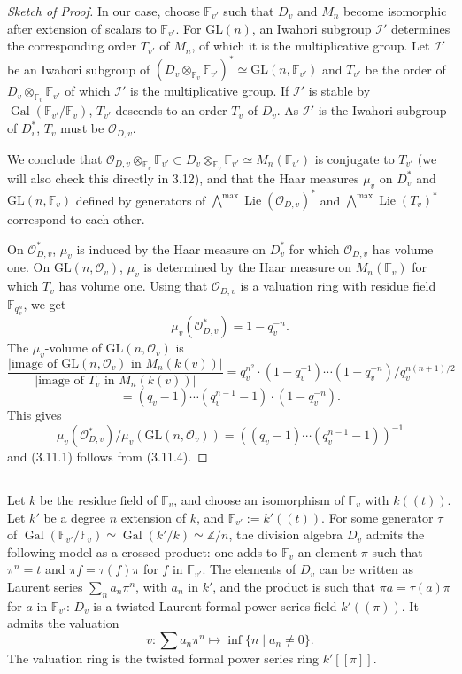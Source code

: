 \documentclass[11pt,a4paper]{article}
\theoremstyle{plain}
\theoremstyle{definition}
\DeclareMathOperator{\Gal}{Gal}
\DeclareMathOperator{\Lie}{Lie}
\newcommand{\F}{\mathbb{F}}
\newcommand{\Z}{\mathbb{Z}}
\newcommand{\GL}{\mathrm{GL}}
\begin{document}
\begin{proof}[Sketch of Proof]
In our case, choose $\mathbb{F}_{v'}$ such that $D_v$ and $M_n$ become isomorphic after extension of scalars to $\mathbb{F}_{v'}$. For $\GL(n)$, an Iwahori subgroup $\mathcal{I}'$ determines the corresponding order $T_{v'}$ of $M_n$, of which it is the multiplicative group. Let $\mathcal{I}'$ be an Iwahori subgroup of $(D_v \otimes_{\mathbb{F}_v} \mathbb{F}_{v'})^* \simeq \GL(n, \mathbb{F}_{v'})$ and $T_{v'}$ be the order of $D_v \otimes_{\mathbb{F}_v} \mathbb{F}_{v'}$ of which $\mathcal{I}'$ is the multiplicative group. If $\mathcal{I}'$ is stable by $\Gal(\mathbb{F}_{v'}/\mathbb{F}_v)$, $T_{v'}$ descends to an order $T_v$ of $D_v$. As $\mathcal{I}'$ is the Iwahori subgroup of $D_v^*$, $T_v$ must be $\mathcal{O}_{D,v}$.

We conclude that $\mathcal{O}_{D,v} \otimes_{\mathbb{F}_v} \mathbb{F}_{v'} \subset D_v \otimes_{\mathbb{F}_v} \mathbb{F}_{v'} \simeq M_n(\mathbb{F}_{v'})$ is conjugate to $T_{v'}$ (we will also check this directly in 3.12), and that the Haar measures $\mu_v$ on $D_v^*$ and $\GL(n, \mathbb{F}_v)$ defined by generators of $\bigwedge^{\max} \Lie(\mathcal{O}_{D,v})^*$ and $\bigwedge^{\max} \Lie(T_v)^*$ correspond to each other.

On $\mathcal{O}_{D,v}^*$, $\mu_v$ is induced by the Haar measure on $D_v^*$ for which $\mathcal{O}_{D,v}$ has volume one. On $\GL(n, \mathcal{O}_v)$, $\mu_v$ is determined by the Haar measure on $M_n(\mathbb{F}_v)$ for which $T_v$ has volume one. Using that $\mathcal{O}_{D,v}$ is a valuation ring with residue field $\F_{q_v^n}$, we get
\[
\mu_v(\mathcal{O}_{D,v}^*) = 1 - q_v^{-n}.
\]
The $\mu_v$-volume of $\GL(n, \mathcal{O}_v)$ is
\[
\frac{|\text{image of }\GL(n, \mathcal{O}_v)\text{ in }M_n(k(v))|}{|\text{image of }T_v\text{ in }M_n(k(v))|} = q_v^{n^2} \cdot (1-q_v^{-1}) \cdots (1-q_v^{-n}) / q_v^{n(n+1)/2}
\]
\[
= (q_v - 1) \cdots (q_v^{n-1} - 1) \cdot (1 - q_v^{-n}).
\]
This gives
\[
\mu_v(\mathcal{O}_{D,v}^*)/\mu_v(\GL(n, \mathcal{O}_v)) = ((q_v - 1) \cdots (q_v^{n-1} - 1))^{-1}
\]
and (3.11.1) follows from (3.11.4).
\end{proof}

\subsection{}
Let $k$ be the residue field of $\mathbb{F}_v$, and choose an isomorphism of $\mathbb{F}_v$ with $k((t))$. Let $k'$ be a degree $n$ extension of $k$, and $\mathbb{F}_{v'} := k'((t))$. For some generator $\tau$ of $\Gal(\mathbb{F}_{v'}/\mathbb{F}_v) \simeq \Gal(k'/k) \simeq \Z/n$, the division algebra $D_v$ admits the following model as a crossed product: one adds to $\mathbb{F}_v$ an element $\pi$ such that $\pi^n = t$ and $\pi f = \tau(f) \pi$ for $f$ in $\mathbb{F}_{v'}$. The elements of $D_v$ can be written as Laurent series $\sum_n a_n \pi^n$, with $a_n$ in $k'$, and the product is such that $\pi a = \tau(a) \pi$ for $a$ in $\mathbb{F}_{v'}$: $D_v$ is a twisted Laurent formal power series field $k'((\pi))$. It admits the valuation
\[
v: \sum a_n \pi^n \mapsto \inf \{n \mid a_n \neq 0\}.
\]
The valuation ring is the twisted formal power series ring $k'[[\pi]]$.
\end{document}
